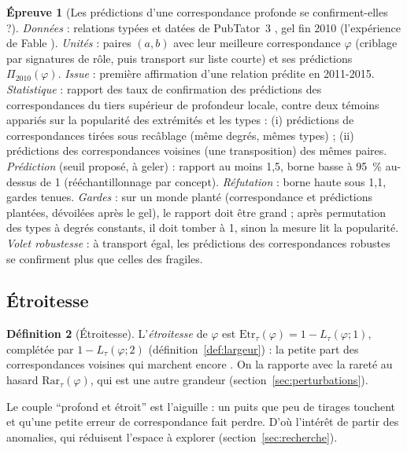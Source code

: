 \documentclass[11pt,a4paper]{article}
\theoremstyle{definition}
\newtheorem{definition}{Définition}[section]
\newtheorem{test}[definition]{Épreuve}
\theoremstyle{plain}
\begin{document}
\begin{test}[Les prédictions d'une correspondance profonde se confirment-elles ?]
\label{test:profondeur}
\emph{Données} : relations typées et datées de PubTator~3 \cite{pubtator2024}, gel fin 2010
(l'expérience de Fable \cite[partie~7]{fable}). \emph{Unités} : paires $(a,b)$ avec leur meilleure
correspondance $\varphi$ (criblage par signatures de rôle, puis transport sur liste courte) et ses
prédictions $\Pi_{2010}(\varphi)$. \emph{Issue} : première affirmation d'une relation prédite en
2011-2015. \emph{Statistique} : rapport des taux de confirmation des prédictions des correspondances
du tiers supérieur de profondeur locale, contre deux témoins appariés sur la popularité des
extrémités et les types : (i) prédictions de correspondances tirées sous recâblage (même degrés,
mêmes types) ; (ii) prédictions des correspondances voisines (une transposition) des mêmes paires.
\emph{Prédiction} (seuil proposé, à geler) : rapport au moins 1,5, borne basse à 95~\% au-dessus de 1
(rééchantillonnage par concept). \emph{Réfutation} : borne haute sous 1,1, gardes tenues.
\emph{Gardes} : sur un monde planté (correspondance et prédictions plantées, dévoilées après le gel),
le rapport doit être grand ; après permutation des types à degrés constants, il doit tomber à 1,
sinon la mesure lit la popularité. \emph{Volet robustesse} : à transport égal, les prédictions des
correspondances robustes se confirment plus que celles des fragiles.
\end{test}

\subsection{Étroitesse}

\begin{definition}[Étroitesse]
\label{def:etroitesse}
L'\emph{étroitesse} de $\varphi$ est $\mathrm{Etr}_\tau(\varphi)=1-L_\tau(\varphi;1)$, complétée par
$1-L_\tau(\varphi;2)$ (définition~\ref{def:largeur}) : la petite part des correspondances voisines
qui marchent encore \cite[point (2)]{complementspectral}. On la rapporte avec la rareté au hasard
$\mathrm{Rar}_\tau(\varphi)$, qui est une autre grandeur (section~\ref{sec:perturbations}).
\end{definition}

Le couple \enquote{profond et étroit} est l'aiguille : un puits que peu de tirages touchent et
qu'une petite erreur de correspondance fait perdre. D'où l'intérêt de partir des anomalies, qui
réduisent l'espace à explorer (section~\ref{sec:recherche}).
\end{document}
